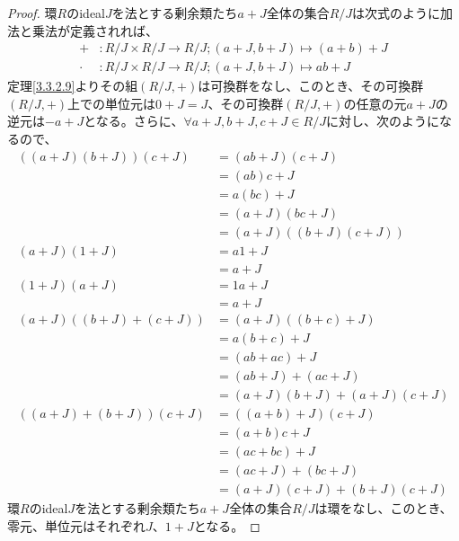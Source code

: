 \documentclass[dvipdfmx]{jsarticle}
\begin{document}
\begin{proof}
環$R$のideal$J$を法とする剰余類たち$a + J$全体の集合${R}/{J}$は次式のように加法と乗法が定義されれば、
\begin{align*}
+ &:{R}/{J} \times {R}/{J} \rightarrow {R}/{J};(a + J,b + J) \mapsto (a + b) + J\\
\cdot &:{R}/{J} \times {R}/{J} \rightarrow {R}/{J};(a + J,b + J) \mapsto ab + J
\end{align*}
定理\ref{3.3.2.9}よりその組$\left( {R}/{J}, + \right)$は可換群をなし、このとき、その可換群$\left( {R}/{J}, + \right)$上での単位元は$0 + J = J$、その可換群$\left( {R}/{J}, + \right)$の任意の元$a + J$の逆元は$- a + J$となる。さらに、$\forall a + J,b + J,c + J \in {R}/{J}$に対し、次のようになるので、
\begin{align*}
\left( (a + J)(b + J) \right)(c + J) &= (ab + J)(c + J)\\
&= (ab)c + J\\
&= a(bc) + J\\
&= (a + J)(bc + J)\\
&= (a + J)\left( (b + J)(c + J) \right)\\
(a + J)(1 + J) &= a1 + J\\
&= a + J\\
(1 + J)(a + J) &= 1a + J\\
&= a + J\\
(a + J)\left( (b + J) + (c + J) \right) &= (a + J)\left( (b + c) + J \right)\\
&= a(b + c) + J\\
&= (ab + ac) + J\\
&= (ab + J) + (ac + J)\\
&= (a + J)(b + J) + (a + J)(c + J)\\
\left( (a + J) + (b + J) \right)(c + J) &= \left( (a + b) + J \right)(c + J)\\
&= (a + b)c + J\\
&= (ac + bc) + J\\
&= (ac + J) + (bc + J)\\
&= (a + J)(c + J) + (b + J)(c + J)
\end{align*}
環$R$のideal$J$を法とする剰余類たち$a + J$全体の集合${R}/{J}$は環をなし、このとき、零元、単位元はそれぞれ$J$、$1 + J$となる。
\end{proof}
\end{document}
